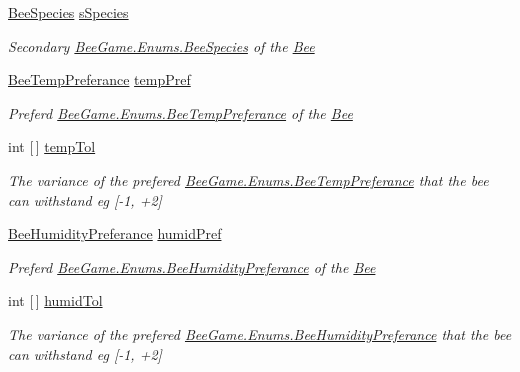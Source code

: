 \begin{DoxyCompactItemize}
\hyperlink{namespace_bee_game_1_1_enums_aa2ead984825678d83c42d48f6382619c}{Bee\+Species} \hyperlink{struct_bee_game_1_1_bee_1_1_combining_bee_data_a8359d180e7a0704e81bb7f37b9aac021}{s\+Species}
\begin{DoxyCompactList}\small\item\em Secondary \hyperlink{namespace_bee_game_1_1_enums_aa2ead984825678d83c42d48f6382619c}{Bee\+Game.\+Enums.\+Bee\+Species} of the \hyperlink{namespace_bee_game_1_1_bee}{Bee} \end{DoxyCompactList}\item 
\hyperlink{namespace_bee_game_1_1_enums_a9db0f9ac859fab168654d657f248b024}{Bee\+Temp\+Preferance} \hyperlink{struct_bee_game_1_1_bee_1_1_combining_bee_data_a93f8cb5caf0b68dd597da1b3ab9e27b5}{temp\+Pref}
\begin{DoxyCompactList}\small\item\em Preferd \hyperlink{namespace_bee_game_1_1_enums_a9db0f9ac859fab168654d657f248b024}{Bee\+Game.\+Enums.\+Bee\+Temp\+Preferance} of the \hyperlink{namespace_bee_game_1_1_bee}{Bee} \end{DoxyCompactList}\item 
int \mbox{[}$\,$\mbox{]} \hyperlink{struct_bee_game_1_1_bee_1_1_combining_bee_data_a31cebfaca3139379e30a43fa0ac7e338}{temp\+Tol}
\begin{DoxyCompactList}\small\item\em The variance of the prefered \hyperlink{namespace_bee_game_1_1_enums_a9db0f9ac859fab168654d657f248b024}{Bee\+Game.\+Enums.\+Bee\+Temp\+Preferance} that the bee can withstand eg \mbox{[}-\/1, +2\mbox{]} \end{DoxyCompactList}\item 
\hyperlink{namespace_bee_game_1_1_enums_a66566cbc9da8d1d1e402156b4bd3bf9d}{Bee\+Humidity\+Preferance} \hyperlink{struct_bee_game_1_1_bee_1_1_combining_bee_data_ab9a9a9623d942632f8007711b65f909e}{humid\+Pref}
\begin{DoxyCompactList}\small\item\em Preferd \hyperlink{namespace_bee_game_1_1_enums_a66566cbc9da8d1d1e402156b4bd3bf9d}{Bee\+Game.\+Enums.\+Bee\+Humidity\+Preferance} of the \hyperlink{namespace_bee_game_1_1_bee}{Bee} \end{DoxyCompactList}\item 
int \mbox{[}$\,$\mbox{]} \hyperlink{struct_bee_game_1_1_bee_1_1_combining_bee_data_a98c56c89bcd5f983b4d022c113f789e3}{humid\+Tol}
\begin{DoxyCompactList}\small\item\em The variance of the prefered \hyperlink{namespace_bee_game_1_1_enums_a66566cbc9da8d1d1e402156b4bd3bf9d}{Bee\+Game.\+Enums.\+Bee\+Humidity\+Preferance} that the bee can withstand eg \mbox{[}-\/1, +2\mbox{]} \end{DoxyCompactList}\item 

\end{DoxyCompactItemize}
